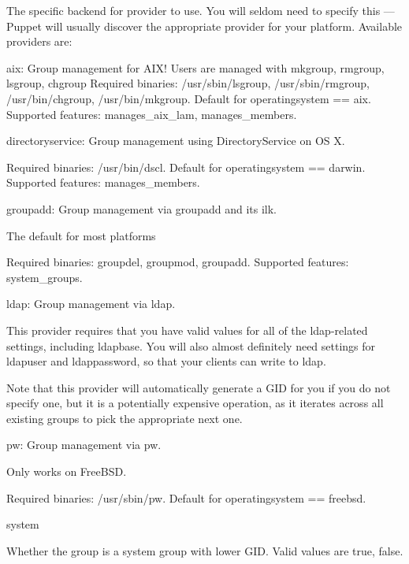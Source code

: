 The specific backend for provider to use. You will seldom need to specify this — Puppet will usually discover the appropriate provider for your platform. Available providers are:

    aix: Group management for AIX! Users are managed with mkgroup, rmgroup, lsgroup, chgroup Required binaries: /usr/sbin/lsgroup, /usr/sbin/rmgroup, /usr/bin/chgroup, /usr/bin/mkgroup. Default for operatingsystem == aix. Supported features: manages_aix_lam, manages_members.

    directoryservice: Group management using DirectoryService on OS X.

    Required binaries: /usr/bin/dscl. Default for operatingsystem == darwin. Supported features: manages_members.

    groupadd: Group management via groupadd and its ilk.

    The default for most platforms

    Required binaries: groupdel, groupmod, groupadd. Supported features: system_groups.

    ldap: Group management via ldap.

    This provider requires that you have valid values for all of the ldap-related settings, including ldapbase. You will also almost definitely need settings for ldapuser and ldappassword, so that your clients can write to ldap.

    Note that this provider will automatically generate a GID for you if you do not specify one, but it is a potentially expensive operation, as it iterates across all existing groups to pick the appropriate next one.

    pw: Group management via pw.

    Only works on FreeBSD.

    Required binaries: /usr/sbin/pw. Default for operatingsystem == freebsd.

system

Whether the group is a system group with lower GID. Valid values are true, false.
